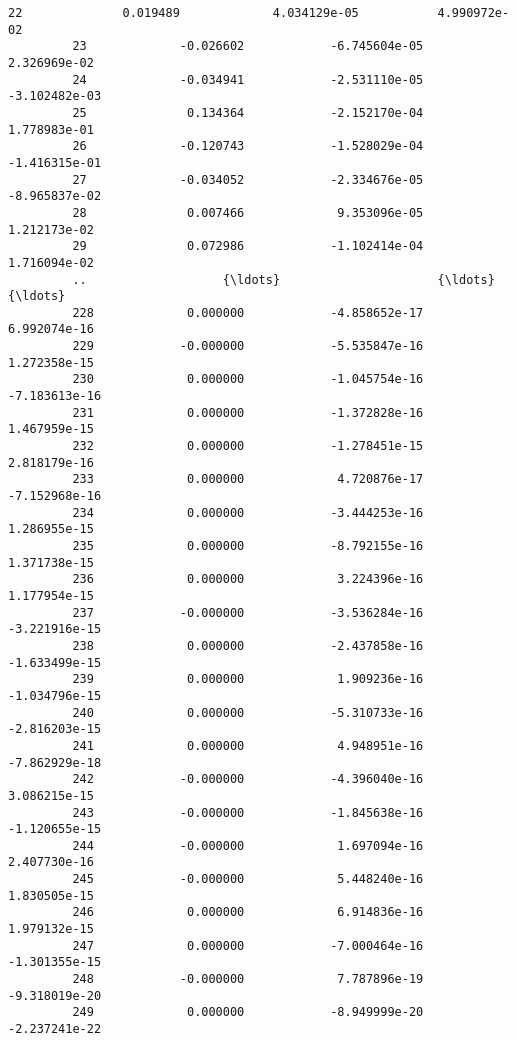 \documentclass[11pt]{article}
\begin{document}
\begin{Verbatim}[commandchars=\\\{\}]
         22              0.019489             4.034129e-05           4.990972e-02   
         23             -0.026602            -6.745604e-05           2.326969e-02   
         24             -0.034941            -2.531110e-05          -3.102482e-03   
         25              0.134364            -2.152170e-04           1.778983e-01   
         26             -0.120743            -1.528029e-04          -1.416315e-01   
         27             -0.034052            -2.334676e-05          -8.965837e-02   
         28              0.007466             9.353096e-05           1.212173e-02   
         29              0.072986            -1.102414e-04           1.716094e-02   
         ..                   {\ldots}                      {\ldots}                    {\ldots}   
         228             0.000000            -4.858652e-17           6.992074e-16   
         229            -0.000000            -5.535847e-16           1.272358e-15   
         230             0.000000            -1.045754e-16          -7.183613e-16   
         231             0.000000            -1.372828e-16           1.467959e-15   
         232             0.000000            -1.278451e-15           2.818179e-16   
         233             0.000000             4.720876e-17          -7.152968e-16   
         234             0.000000            -3.444253e-16           1.286955e-15   
         235             0.000000            -8.792155e-16           1.371738e-15   
         236             0.000000             3.224396e-16           1.177954e-15   
         237            -0.000000            -3.536284e-16          -3.221916e-15   
         238             0.000000            -2.437858e-16          -1.633499e-15   
         239             0.000000             1.909236e-16          -1.034796e-15   
         240             0.000000            -5.310733e-16          -2.816203e-15   
         241             0.000000             4.948951e-16          -7.862929e-18   
         242            -0.000000            -4.396040e-16           3.086215e-15   
         243            -0.000000            -1.845638e-16          -1.120655e-15   
         244            -0.000000             1.697094e-16           2.407730e-16   
         245            -0.000000             5.448240e-16           1.830505e-15   
         246             0.000000             6.914836e-16           1.979132e-15   
         247             0.000000            -7.000464e-16          -1.301355e-15   
         248            -0.000000             7.787896e-19          -9.318019e-20   
         249             0.000000            -8.949999e-20          -2.237241e-22   

\end{Verbatim}
\end{document}
